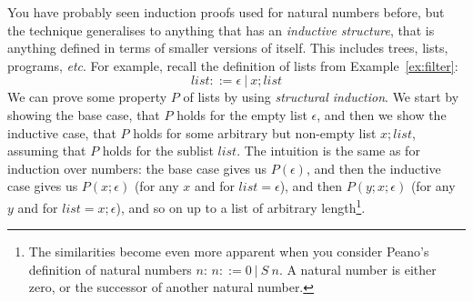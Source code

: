 \documentclass{tufte-handout}
\newcounter{example}
\begin{document}
You have probably seen induction proofs used for natural numbers
before, but the technique generalises to anything that has an
\emph{inductive structure}, that is anything defined in terms of
smaller versions of itself. This includes trees, lists, programs,
\emph{etc}.
%
For example, recall the definition of lists from
Example~\ref{ex:filter}:
\[
  \mathit{list} ::= \epsilon ~|~ x; \mathit{list}
\]
We can prove some property $P$ of lists by using \emph{structural
  induction}. We start by showing the base case, that $P$ holds
for the empty list $\epsilon$, and then we show the inductive
case, that $P$ holds for some arbitrary but non-empty list
$x;\mathit{list}$, assuming that $P$ holds for the sublist
$\mathit{list}$.
%
The intuition is the same as for induction over numbers: the base
case gives us $P(\epsilon)$, and then the inductive case gives us
$P(x;\epsilon)$ (for any $x$ and for $\mathit{list} = \epsilon$),
and then $P(y;x;\epsilon)$ (for any $y$ and for
$\mathit{list} = x;\epsilon$), and so on up to a list of arbitrary
length\footnote{The similarities become even more apparent when
  you consider Peano's definition of natural numbers $n$:
  $n ::= 0 ~|~ S~n$. A natural number is either zero, or the
  successor of another natural number. }.
\end{document}
